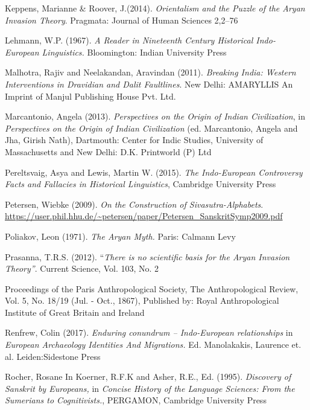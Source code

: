 \begin{thebibliography}{99}
  Keppens, Marianne \& Roover, J.(2014). \textit{Orientalism and the Puzzle of the Aryan Invasion Theory}. Pragmata: Journal of Human Sciences 2,2–76

  Lehmann, W.P. (1967). \textit{A Reader in Nineteenth Century Historical Indo-European Linguistics. } Bloomington: Indian University Press

  Malhotra, Rajiv and Neelakandan, Aravindan (2011). \textit{Breaking India: Western Interventions in Dravidian and Dalit Faultlines}. New Delhi: AMARYLLIS An Imprint of Manjul Publishing House Pvt. Ltd.

  Marcantonio, Angela (2013). \textit{Perspectives on the Origin of Indian Civilization}, in \textit{Perspectives on the Origin of Indian Civilization} (ed. Marcantonio, Angela and Jha, Girish Nath), Dartmouth: Center for Indic Studies, University of Massachusetts and New Delhi: D.K. Printworld (P) Ltd

  Pereltsvaig, Asya and Lewis, Martin W. (2015). \textit{The Indo-European Controversy Facts and Fallacies in Historical Linguistics}, Cambridge University Press

  Petersen, Wiebke (2009). \textit{On the Construction of Sivasutra-Alphabets}. \url{https://user.phil.hhu.de/~petersen/paper/Petersen_SanskritSymp2009.pdf}

  Poliakov, Leon (1971). \textit{The Aryan Myth.} Paris: Calmann Levy

  Prasanna, T.R.S. (2012). “\textit{There is no scientific basis for the Aryan Invasion Theory”}. Current Science, Vol. 103, No. 2

  Proceedings of the Paris Anthropological Society, The Anthropological Review, Vol. 5, No. 18/19 (Jul. - Oct., 1867), Published by: Royal Anthropological Institute of Great Britain and Ireland

  Renfrew, Colin (2017). \textit{Enduring conundrum – Indo-European relationships} in \textit{European Archaeology Identities And Migrations.} Ed. Manolakakis, Laurence et. al. Leiden:Sidestone Press

  Rocher, Rosane In Koerner, R.F.K and Asher, R.E., Ed. (1995). \textit{Discovery of Sanskrit by Europeans, }in \textit{Concise History of the Language Sciences: From the Sumerians to Cognitivists.}, PERGAMON, Cambridge University Press


\end{thebibliography}

